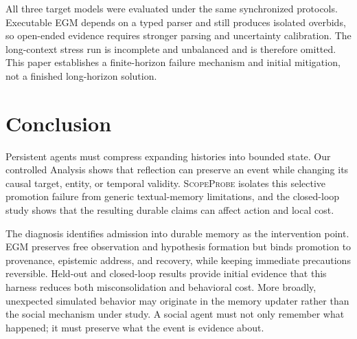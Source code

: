 \documentclass[sigconf,anonymous]{acmart}
\newcommand{\method}{\textsc{ScopeProbe}}
\begin{document}
All three target models were evaluated under the same synchronized protocols.
Executable EGM depends on a typed parser and
still produces isolated overbids, so open-ended evidence requires stronger
parsing and uncertainty calibration. The long-context stress run is incomplete
and unbalanced and is therefore omitted. This paper establishes a finite-horizon
failure mechanism and initial mitigation, not a finished long-horizon solution.

\section{Conclusion}

Persistent agents must compress expanding histories into bounded state.
Our controlled Analysis shows that reflection can preserve an event while
changing its causal target, entity, or temporal validity. \method{} isolates
this selective promotion failure from generic textual-memory limitations, and
the closed-loop study shows that the resulting durable claims can affect action
and local cost.

The diagnosis identifies admission into durable memory as the intervention
point. EGM preserves free observation and hypothesis formation but binds
promotion to provenance, epistemic address, and recovery, while keeping
immediate precautions reversible. Held-out and closed-loop results provide
initial evidence that this harness reduces both misconsolidation and behavioral
cost. More broadly, unexpected simulated behavior may originate in the memory
updater rather than the social mechanism under study. A social agent must not
only remember what happened; it must preserve what the event is evidence about.



\end{document}
